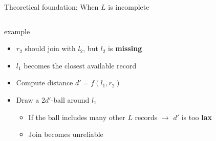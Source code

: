 \documentclass[8pt]{beamer} %
\begin{document}
\begin{frame}{Theoretical foundation: When $L$ is incomplete}
\begin{columns}
\begin{column}{0.43\textwidth}
\begin{beamercolorbox}[rounded=true, shadow=true, leftskip=1em, rightskip=1em]{example}
				\begin{itemize}
					\item $r_2$ should join with $l_2$, but $l_2$ is \textbf{missing}
					\item $l_1$ becomes the closest available record
					\item Compute distance $d' = f(l_1, r_2)$
					\item Draw a 2$d'$-ball around $l_1$
					\begin{itemize}
						\item If the ball includes many other $L$ records $\rightarrow$ $d'$ is too \textbf{lax}
						\item Join becomes unreliable
					\end{itemize}
				\end{itemize}
				
			\end{beamercolorbox}
		\end{column}
	\end{columns}
\end{frame}
	
\end{document}

